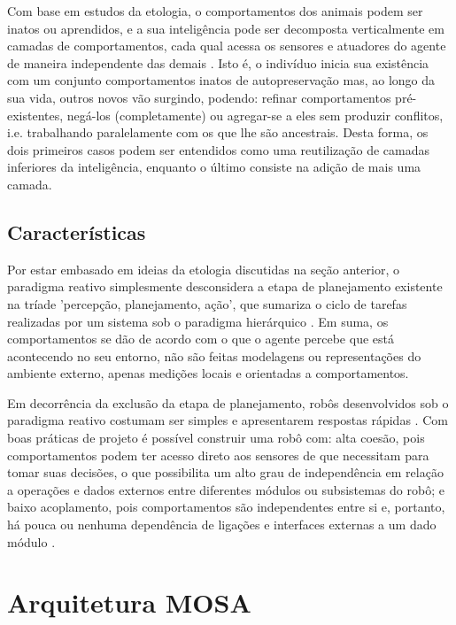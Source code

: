 Com base em estudos da etologia, o comportamentos dos animais podem ser inatos ou aprendidos, e a sua inteligência pode ser decomposta verticalmente 
em camadas de comportamentos, cada qual acessa os sensores e atuadores do agente de maneira independente das demais \cite{murphy}.
Isto é, o indivíduo inicia sua existência com um conjunto comportamentos inatos de autopreservação mas, ao longo da sua vida, outros 
novos vão surgindo, podendo: refinar comportamentos pré-existentes, negá-los (completamente) ou agregar-se a eles sem produzir conflitos, 
i.e. trabalhando paralelamente com os que lhe são ancestrais.
Desta forma, os dois primeiros casos podem ser entendidos como uma reutilização de camadas inferiores da inteligência, enquanto o 
último consiste na adição de mais uma camada.

\subsection{Características}
Por estar embasado em ideias da etologia discutidas na seção anterior, o paradigma reativo simplesmente desconsidera a etapa de planejamento 
existente na tríade 'percepção, planejamento, ação', que sumariza o ciclo de tarefas realizadas por um sistema sob o paradigma hierárquico 
\cite{murphy,roseli}.
Em suma, os comportamentos se dão de acordo com o que o agente percebe que está acontecendo no seu entorno, não são feitas modelagens ou 
representações do ambiente externo, apenas medições locais e orientadas a comportamentos.

Em decorrência da exclusão da etapa de planejamento, robôs desenvolvidos sob o paradigma reativo costumam ser simples e apresentarem 
respostas rápidas \cite{roseli}.
Com boas práticas de projeto é possível construir uma robô com: alta coesão, pois comportamentos podem ter acesso direto aos sensores de que 
necessitam para tomar suas decisões, o que possibilita um alto grau de independência em relação a operações e dados externos entre diferentes módulos 
ou subsistemas do robô; e baixo acoplamento, pois comportamentos são independentes entre si e, portanto, há pouca ou nenhuma dependência de ligações 
e 
interfaces externas a um dado módulo \cite{murphy}.


\section{Arquitetura MOSA}

